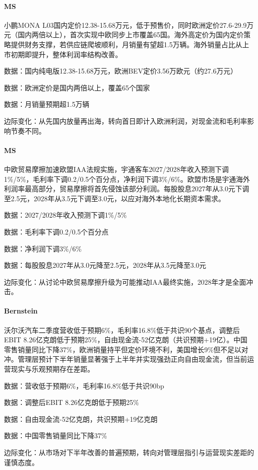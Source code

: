 \documentclass[11pt]{ctexart}
\begin{document}
\paragraph{MS} 小鹏MONA L03国内定价12.38-15.68万元，低于预售价，同时欧洲定价27.6-29.9万元（国内两倍以上），首次实现中欧同步上市覆盖65国。海外高定价为国内定价策略提供财务支撑，若供应链爬坡顺利，月销量有望超1.5万辆。海外销量占比从上市初期即提升，整体利润率结构改善。
{\small\color{refgray}数据：国内纯电版12.38-15.68万元，欧洲BEV定价3.56万欧元（约27.6万元）\par}
{\small\color{refgray}数据：欧洲定价是国内两倍以上，覆盖65个国家\par}
{\small\color{refgray}数据：月销量预期超1.5万辆\par}
{\small\color{refgray}边际变化：从先国内放量再出海，转向首日即计入欧洲利润，对现金流和毛利率影响节奏不同。\par}
\paragraph{MS} 中欧贸易摩擦加速欧盟IAA法规实施，宇通客车2027/2028年收入预测下调1\%/5\%，毛利率下调0.2/0.5个百分点，净利润下调3\%/6\%。欧盟市场是宇通海外利润率最高部分，贸易摩擦将首先侵蚀该部分利润。每股股息2027年从3.0元下调至2.5元，2028年从3.5元下调至3.0元，以应对海外本地化长期资本需求。
{\small\color{refgray}数据：2027/2028年收入预测下调1\%/5\%\par}
{\small\color{refgray}数据：毛利率下调0.2/0.5个百分点\par}
{\small\color{refgray}数据：净利润下调3\%/6\%\par}
{\small\color{refgray}数据：每股股息2027年从3.0元降至2.5元，2028年从3.5元降至3.0元\par}
{\small\color{refgray}边际变化：从讨论中欧贸易摩擦升级为可能推动IAA最终实施，2028年才是全面冲击。\par}
\paragraph{Bernstein} 沃尔沃汽车二季度营收低于预期6\%，毛利率16.8\%低于共识90个基点，调整后EBIT 8.26亿克朗低于预期25\%，自由现金流-52亿克朗（共识预期+19亿）。中国零售销量同比下降37\%，欧洲销量持平但定价环境不利，美国增长9\%但不足以对冲。管理层预计下半年销量显著强于上半年并实现强劲正向自由现金流，但当前运营现实与乐观预期存在差距。
{\small\color{refgray}数据：营收低于预期6\%，毛利率16.8\%低于共识90bp\par}
{\small\color{refgray}数据：调整后EBIT 8.26亿克朗低于预期25\%\par}
{\small\color{refgray}数据：自由现金流-52亿克朗，共识预期+19亿克朗\par}
{\small\color{refgray}数据：中国零售销量同比下降37\%\par}
{\small\color{refgray}边际变化：从市场对下半年改善的普遍预期，转向对管理层指引与运营现实差距的谨慎态度。\par}
\end{document}
